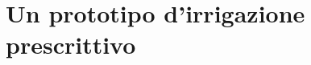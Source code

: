 \documentclass[12pt,a4paper,openright,twoside, openany, draft]{book}
\begin{document}

\chapter{Un prototipo d'irrigazione prescrittivo}\label{capitolo-3}
\end{document}
